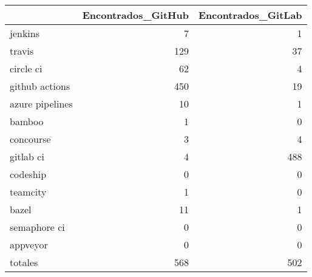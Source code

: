 \begin{tabular}{lrr}
\toprule
{} &  Encontrados\_GitHub &  Encontrados\_GitLab \\
\midrule
jenkins         &                   7 &                   1 \\
travis          &                 129 &                  37 \\
circle ci       &                  62 &                   4 \\
github actions  &                 450 &                  19 \\
azure pipelines &                  10 &                   1 \\
bamboo          &                   1 &                   0 \\
concourse       &                   3 &                   4 \\
gitlab ci       &                   4 &                 488 \\
codeship        &                   0 &                   0 \\
teamcity        &                   1 &                   0 \\
bazel           &                  11 &                   1 \\
semaphore ci    &                   0 &                   0 \\
appveyor        &                   0 &                   0 \\
totales         &                 568 &                 502 \\
\bottomrule
\end{tabular}
